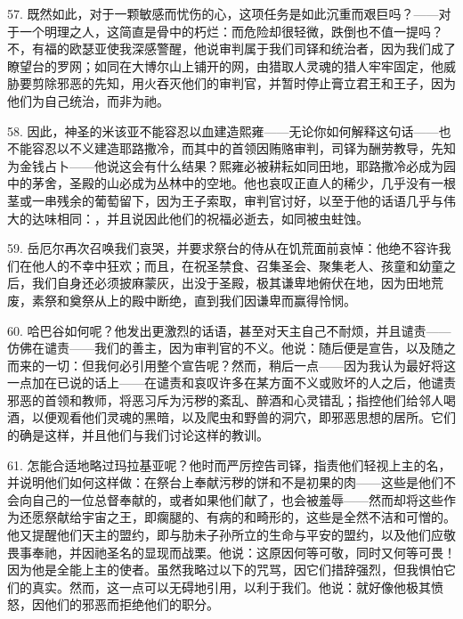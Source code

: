 57. 既然如此，对于一颗敏感而忧伤的心，这项任务是如此沉重而艰巨吗？——对于一个明理之人，这简直是骨中的朽烂：而危险却很轻微，跌倒也不值一提吗？不，有福的欧瑟亚使我深感警醒，他说审判属于我们司铎和统治者，因为我们成了瞭望台的罗网；如同在大博尔山上铺开的网，由猎取人灵魂的猎人牢牢固定，他威胁要剪除邪恶的先知，用火吞灭他们的审判官，并暂时停止膏立君王和王子，因为他们为自己统治，而非为祂。\par

58. 因此，神圣的米该亚不能容忍以血建造熙雍——无论你如何解释这句话——也不能容忍以不义建造耶路撒冷，而其中的首领因贿赂审判，司铎为酬劳教导，先知为金钱占卜——他说这会有什么结果？熙雍必被耕耘如同田地，耶路撒冷必成为园中的茅舍，圣殿的山必成为丛林中的空地。他也哀叹正直人的稀少，几乎没有一根茎或一串残余的葡萄留下，因为王子索取，审判官讨好，以至于他的话语几乎与伟大的达味相同：，并且说因此他们的祝福必逝去，如同被虫蛀蚀。\par

59. 岳厄尔再次召唤我们哀哭，并要求祭台的侍从在饥荒面前哀悼：他绝不容许我们在他人的不幸中狂欢；而且，在祝圣禁食、召集圣会、聚集老人、孩童和幼童之后，我们自身还必须披麻蒙灰，出没于圣殿，极其谦卑地俯伏在地，因为田地荒废，素祭和奠祭从上的殿中断绝，直到我们因谦卑而赢得怜悯。\par

60. 哈巴谷如何呢？他发出更激烈的话语，甚至对天主自己不耐烦，并且谴责——仿佛在谴责——我们的善主，因为审判官的不义。他说：随后便是宣告，以及随之而来的一切：但我何必引用整个宣告呢？然而，稍后一点——因为我认为最好将这一点加在已说的话上——在谴责和哀叹许多在某方面不义或败坏的人之后，他谴责邪恶的首领和教师，将恶习斥为污秽的紊乱、醉酒和心灵错乱；指控他们给邻人喝酒，以便观看他们灵魂的黑暗，以及爬虫和野兽的洞穴，即邪恶思想的居所。它们的确是这样，并且他们与我们讨论这样的教训。\par

61. 怎能合适地略过玛拉基亚呢？他时而严厉控告司铎，指责他们轻视上主的名，并说明他们如何这样做：在祭台上奉献污秽的饼和不是初果的肉——这些是他们不会向自己的一位总督奉献的，或者如果他们献了，也会被羞辱——然而却将这些作为还愿祭献给宇宙之王，即瘸腿的、有病的和畸形的，这些是全然不洁和可憎的。他又提醒他们天主的盟约，即与肋未子孙所立的生命与平安的盟约，以及他们应敬畏事奉祂，并因祂圣名的显现而战栗。他说：这原因何等可敬，同时又何等可畏！因为他是全能上主的使者。虽然我略过以下的咒骂，因它们措辞强烈，但我惧怕它们的真实。然而，这一点可以无碍地引用，以利于我们。他说：就好像他极其愤怒，因他们的邪恶而拒绝他们的职分。\par

